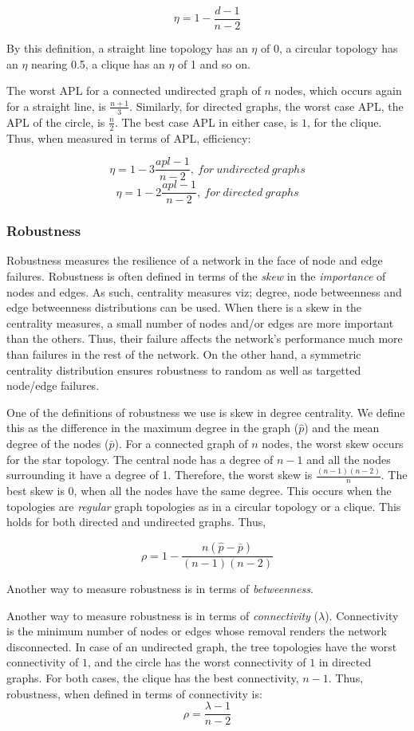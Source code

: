 \documentclass[a4paper,10pt]{article}
\begin{document}
\[ \eta = 1 - \frac{d - 1} {n - 2} \]

By this definition, a straight line topology has an $\eta$ of 0, a circular topology has an $\eta$ nearing 0.5, a clique has an $\eta$ of 1 and so on.

The worst APL for a connected undirected graph of $n$ nodes, which occurs again for a straight line, is $\frac{n + 1}{3}$. Similarly, for directed graphs, the worst case APL, the APL of the circle, is $\frac{n}{2}$. The best case APL in either case, is $1$, for the clique. Thus, when measured in terms of APL, efficiency:

\[\eta = 1 - 3\frac{apl - 1} {n - 2},\ for\ undirected\ graphs\]
\[\eta = 1 - 2\frac{apl - 1} {n - 2},\ for\ directed\ graphs\]

\subsubsection{Robustness}
Robustness measures the resilience of a network in the face of node and edge failures. Robustness is often defined in terms of the \textit{skew} in the \textit{importance} of nodes and edges. As such, centrality measures viz; degree, node betweenness and edge betweenness distributions can be used. When there is a skew in the centrality measures, a small number of nodes and/or edges are more important than the others. Thus, their failure affects the network's performance much more than failures in the rest of the network. On the other hand, a symmetric centrality distribution ensures robustness to random as well as targetted node/edge failures.

One of the definitions of robustness we use is skew in degree centrality. We define this as the difference in the maximum degree in the graph ($\hat{p}$) and the mean degree of the nodes ($\bar{p}$). For a connected graph of $n$ nodes, the worst skew occurs for the star topology. The central node has a degree of $n - 1$ and all the nodes surrounding it have a degree of 1. Therefore, the worst skew is $\frac{(n - 1)(n - 2)}{n}$. The best skew is 0, when all the nodes have the same degree. This occurs when the topologies are \textit{regular} graph topologies as in a circular topology or a clique. This holds for both directed and undirected graphs. Thus,

\[\rho = 1 - \frac{n(\hat{p} - \bar{p})}{(n - 1)(n - 2)}\]

Another way to measure robustness is in terms of \textit{betweenness}. 

Another way to measure robustness is in terms of \textit{connectivity} ($\lambda$). Connectivity is the minimum number of nodes or edges whose removal renders the network disconnected. In case of an undirected graph, the tree topologies have the worst connectivity of $1$, and the circle has the worst connectivity of $1$ in directed graphs. For both cases, the clique has the best connectivity, $n - 1$. Thus, robustness, when defined in terms of connectivity is:
\[\rho = \frac{\lambda - 1}{n - 2}\]
\end{document}

